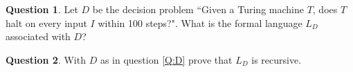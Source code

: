 \documentclass{article}
\theoremstyle{definition}
\newtheorem{Q}{Question}
\newcommand{\co}{\mathbf{code}}
\begin{document}
\begin{Q}\label{\prefix Q:D}
Let $D$ be the decision problem ``Given a Turing machine $T$, does $T$ halt on every input $I$ within 100 steps?". What is the formal language $L_D$ associated with $D$?
\end{Q}
\begin{comment}
\textbf{Solution}\\
$\{\co(T): T$ is a Turing machine and $T(I)$ halts within 100 steps for all $I\}$.
\end{comment}

\begin{Q}
With $D$ as in question \ref{Q:D} prove that $L_D$ is recursive. 
\end{Q}
\begin{comment}
\textbf{Solution}\\
Note that $T(I)$ halts for all $I$ within 100 steps if and only if $T(I)$ halts for all $I$ of length $\leq 100$ within 100 steps, as $T$ can never read past the first 100 symbols within 100 steps. Now, the number of strings over a finite alphabet whose length is $\leq 100$ is finite, so we can check $T(I)$ for each such string $I$ using the algorithm from question \ref{Q:100}. If the answer is no for any $I$ we reject $\co(T)$, and if the answer is yes for all $I$ we accept $\co(T)$.
\end{comment}
\end{document}
